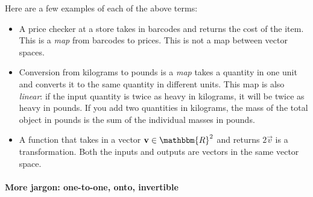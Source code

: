 \begin{example}
Here are a few examples of each of the above terms:
\begin{itemize}
    \item A price checker at a store takes in barcodes and returns the cost of the item. This is a \emph{map} from barcodes to prices. This is not a map between vector spaces.\sidenotemark
    \item Conversion from kilograms to pounds is a \emph{map} takes a quantity in one unit and converts it to the same quantity in different units. This map is also \emph{linear}: if the input quantity is twice as heavy in kilograms, it will be twice as heavy in pounds. If you add two quantities in kilograms, the mass of the total object in pounds is the sum of the individual masses in pounds.
    \item A function that takes in a vector $\vec{v}\in\mathbbm{R}^2$ and returns $2\vec{v}$ is a transformation. Both the inputs and outputs are vectors in the same vector space. 
\end{itemize}
\end{example}

\paragraph{More jargon: one-to-one, onto, invertible}

